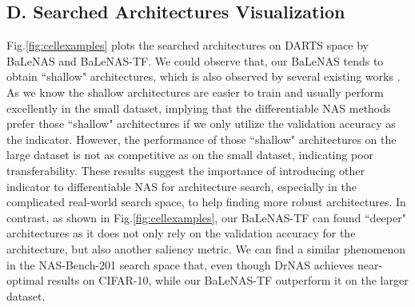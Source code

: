 \documentclass[10pt,twocolumn,letterpaper]{article}
\begin{document}
\subsection*{D. Searched Architectures Visualization}
Fig.\ref{fig:cellexamples} plots the searched architectures on DARTS space by BaLeNAS and BaLeNAS-TF. We could observe that, our BaLeNAS tends to obtain ``shallow" architectures, which is also observed by several existing works \cite{zhang2020onetpami,nayman2019xnas}. As we know the shallow architectures are easier to train and usually perform excellently in the small dataset, implying that the differentiable NAS methods prefer those ``shallow" architectures if we only utilize the validation accuracy as the indicator. However, the performance of those ``shallow" architectures on the large dataset is not as competitive as on the small dataset, indicating poor transferability. These results suggest the importance of introducing other indicator to differentiable NAS for architecture search, especially in the complicated real-world search space, to help finding more robust architectures. In contrast, as shown in Fig.\ref{fig:cellexamples}, our BaLeNAS-TF can found ``deeper" architectures as it does not only rely on the validation accuracy for the architecture, but also another saliency metric. We can find a similar phenomenon in the NAS-Bench-201 search space that, even though DrNAS achieves near-optimal results on CIFAR-10, while our BaLeNAS-TF outperform it on the larger dataset.
\end{document}
